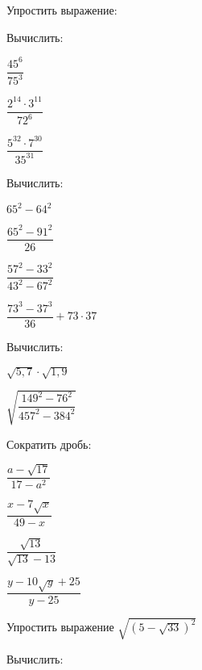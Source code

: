 \begin{listofex}
	\item Упростить выражение:
	\begin{enumcols}[itemcolumns=2]
		\item {}
		\item {}
	\end{enumcols}
	\item Вычислить:
	\begin{enumcols}[itemcolumns=3]
		\item \( \dfrac{45^6}{75^3} \)
		\item \( \dfrac{2^{14}\cdot3^{11}}{72^6} \)
		\item \( \dfrac{5^{32}\cdot7^{30}}{35^{31}} \)
	\end{enumcols}
	\item Вычислить:
	\begin{enumcols}[itemcolumns=3]
		\item \( 65^2-64^2 \)
		\item \( \dfrac{65^2-91^2}{26} \)
		\item \( \dfrac{57^2-33^2}{43^2-67^2} \)
		\item \( \dfrac{73^3-37^3}{36}+73\cdot37 \)
	\end{enumcols}
	\item Вычислить:
	\begin{enumcols}[itemcolumns=3]
		\item \( \sqrt{5,7}\cdot\sqrt{1,9} \)
		\item \( \sqrt{\dfrac{149^2-76^2}{457^2-384^2}} \)
		\item {}
	\end{enumcols}
	\item Сократить дробь:
	\begin{enumcols}[itemcolumns=2]
		\item \( \dfrac{a-\sqrt{17}}{17-a^2} \)
		\item \( \dfrac{x-7\sqrt{x}}{49-x} \)
		\item \( \dfrac{\sqrt{13}}{\sqrt{13}-13} \)
		\item \( \dfrac{y-10\sqrt{y}+25}{y-25} \)
	\end{enumcols}
	\item Упростить выражение \( \sqrt{(5-\sqrt{33})^2} \)
	\item Вычислить:
	\begin{enumcols}[itemcolumns=2]
		\item {}
		\item {}
	\end{enumcols}
\end{listofex}
